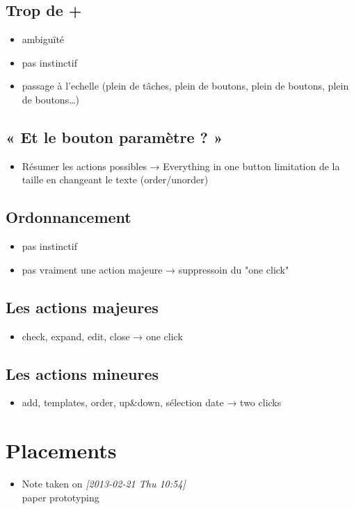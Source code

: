 \documentclass[11pt]{article}
\begin{document}
\subsection{Trop de +}
\begin{itemize}
\item ambiguïté
\item pas instinctif
\item passage à l'echelle (plein de tâches, plein de boutons, plein de
  boutons, plein de boutons\ldots{})
\end{itemize}


\subsection{« Et le bouton paramètre ? »}
\begin{itemize}
\item Résumer les actions possibles → Everything in one button
  limitation de la taille en changeant le texte (order/unorder)
\end{itemize}


\subsection{Ordonnancement}
\begin{itemize}
\item pas instinctif
\item pas vraiment une action majeure
  → suppressoin du "one click"
\end{itemize}


\subsection{Les actions majeures}
\begin{itemize}
\item check, expand, edit, close
  → one click
\end{itemize}


\subsection{Les actions mineures}
\begin{itemize}
\item add, templates, order, up\&down, sélection date
  → two clicks
\end{itemize}


\section{Placements}
\begin{itemize}
\item Note taken on \textit{[2013-02-21 Thu 10:54]} \\
  paper prototyping
\end{itemize}
\end{document}
